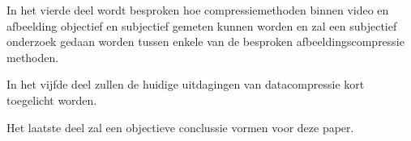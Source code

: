 In het vierde deel wordt besproken hoe compressiemethoden binnen video en afbeelding objectief en subjectief gemeten kunnen worden en zal een subjectief onderzoek gedaan worden tussen enkele van de besproken afbeeldingscompressie methoden.

In het vijfde deel zullen de huidige uitdagingen van datacompressie kort toegelicht worden.

Het laatste deel zal een objectieve conclussie vormen voor deze paper.

